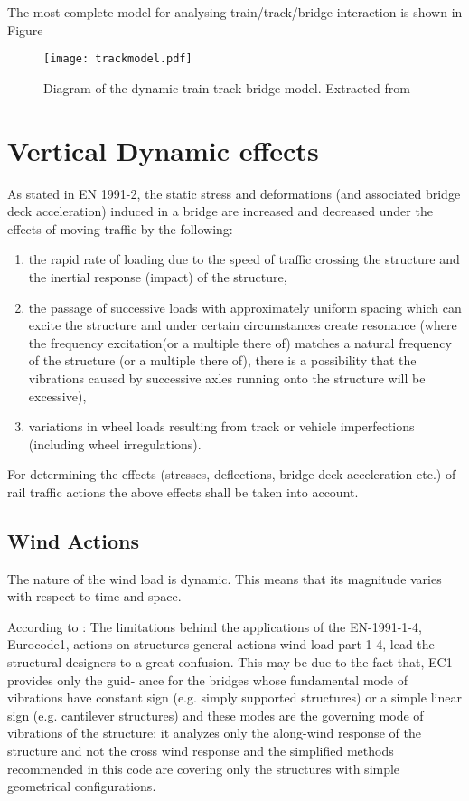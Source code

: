 The most complete model for analysing train/track/bridge interaction is shown in Figure

\begin{figure}[h]
	\centering
	\texttt{[image: trackmodel.pdf]}
	\caption{Diagram of the dynamic train-track-bridge model. Extracted from \cite[Fig. 15]{uic}}
	\label{fig:trackmodel}
\end{figure}



\section{Vertical Dynamic effects}
As stated in EN 1991-2\cite{EC12}, the static stress and deformations (and associated bridge deck acceleration) induced in a bridge are increased and decreased under the effects of moving traffic by the following:

\begin{enumerate}[-]
	\item the rapid rate of loading due to the speed of traffic crossing the structure and the inertial response (impact) of the structure,
	\item the passage of successive loads with approximately uniform spacing which can excite the structure and under certain circumstances create resonance (where the frequency excitation(or a multiple there of) matches a natural frequency of the structure (or a multiple there of), there is a possibility that the vibrations caused by successive axles running onto the structure will be excessive),
	\item variations in wheel loads resulting from track or vehicle imperfections (including wheel irregulations).
\end{enumerate}

For determining the effects (stresses, deflections, bridge deck acceleration etc.) of rail traffic actions the above effects shall be taken into account.

\subsection{Wind Actions}
The nature of the wind load is dynamic. This means that its magnitude varies with respect to time and space.

According to \cite{mohammadi2013wind}: The limitations behind the applications of the EN-1991-1-4, Eurocode1, actions on structures-general actions-wind load-part 1-4, lead the structural designers to a great confusion. This may be due to the fact that, EC1 provides only the guid- ance for the bridges whose fundamental mode of vibrations have constant sign (e.g. simply supported structures) or a simple linear sign (e.g. cantilever structures) and these modes are the governing mode of vibrations of the structure; it analyzes only the along-wind response of the structure and not the cross wind response and the simplified methods recommended in this code are covering only the structures with simple geometrical configurations.

